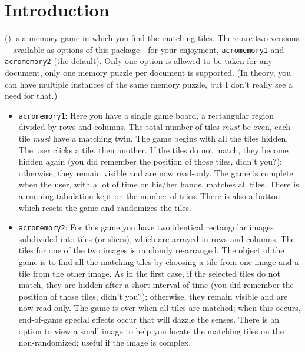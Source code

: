 \documentclass{article}
\begin{document}

\maketitle



\tableofcontents



\section{Introduction}

 () is a memory game in which you find the
matching tiles. There are two versions---available as options of
this package---for your enjoyment, \texttt{acromemory1} and
\texttt{acromemory2} (the default). Only one option is allowed to be taken for any document,
only one memory puzzle per document is supported. (In theory, you can have multiple instances of the same
memory puzzle, but I don't really see a need for that.)
\begin{itemize}
   \item \texttt{acromemory1}: Here you have a single game board, a
        rectangular region divided by rows and columns. The total number
        of tiles \emph{must} be even, each tile \emph{must} have a matching twin.
        The game begins with all the tiles hidden. The user clicks a
        tile, then another. If the tiles do not match, they become
        hidden again (you did remember the position of those tiles,
        didn't you?); otherwise, they remain visible and are now
        read-only. The game is complete when the user, with a lot of time
        on his/her hands, matches all tiles. There is a running
        tabulation kept on the number of tries.  There is also a button
        which resets the game and randomizes the tiles.

  \item \texttt{acromemory2}: For this game you have two identical
        rectangular images subdivided into tiles (or slices), which
        are arrayed in rows and columns. The tiles for one of the
        two images is randomly re-arranged. The object of the
        game is to find all the matching tiles by choosing a tile
        from one image and a tile from the other image. As in the
        first case, if the selected tiles do not match, they are
        hidden after a short interval of time (you did remember the
        position of those tiles, didn't you?); otherwise, they
        remain visible and are now read-only. The game is over when
        all tiles are matched; when this occurs, end-of-game special
        effects occur that will dazzle the senses. There is an
        option to view a small image to help you locate the matching
        tiles on the non-randomized; useful if the image is complex.
\end{itemize}
\end{document}
